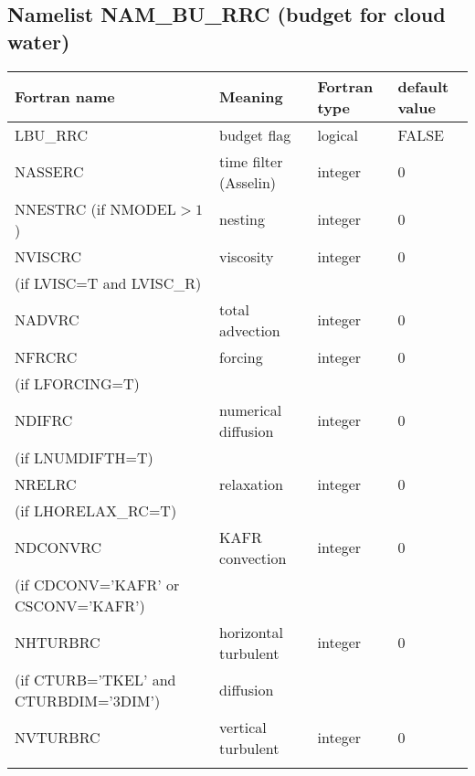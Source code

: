 \newpage
\subsection{Namelist NAM\_BU\_RRC (budget for cloud water)}

\begin{longtable} {|p{}|p{}|>{\centering}p{}|p{}<{\centering}|}
\hline
Fortran name & Meaning & Fortran type & default value \\
\hline \hline
\endhead
LBU\_RRC & budget flag & logical & FALSE\index{LBU\_RRC!\innam{NAM\_BU\_RRC}} \\\hline
NASSERC  & time filter (Asselin)   & integer  &  0 \index{NASSERC!\innam{NAM\_BU\_RRC}} \\\hline
NNESTRC (if NMODEL$>1$) & nesting           & integer  &  0 \index{NNESTRC!\innam{NAM\_BU\_RRC}} \\\hline
NVISCRC  & viscosity         & integer  &  0 \index{NVISCRC!\innam{NAM\_BU\_RRC}}\\
(if LVISC=T and LVISC\_R) &  &   &   \\\hline
NADVRC   & total advection   & integer  &  0 \index{NADVRC!\innam{NAM\_BU\_RRC}}\\\hline
NFRCRC   & forcing           & integer  &  0 \index{NFRCRC!\innam{NAM\_BU\_RRC}} \\ \nopagebreak
(if LFORCING=T) &  &   &   \\\hline
NDIFRC   & numerical diffusion & integer  &  0 \index{NDIFRC!\innam{NAM\_BU\_RRC}}\\ \nopagebreak
(if LNUMDIFTH=T) &  &   &   \\\hline
NRELRC   & relaxation        & integer  &  0 \index{NRELRC!\innam{NAM\_BU\_RRC}}\\ \nopagebreak
(if LHORELAX\_RC=T) &  &   &   \\\hline
NDCONVRC & KAFR convection   & integer  &  0 \index{NDCONVRC!\innam{NAM\_BU\_RRC}} \\ \nopagebreak
(if CDCONV='KAFR' or CSCONV='KAFR') &  &   &   \\\hline
NHTURBRC & horizontal turbulent  & integer  &  0 \index{NHTURBRC!\innam{NAM\_BU\_RRC}}\\ \nopagebreak
(if CTURB='TKEL' and CTURBDIM='3DIM') &diffusion &   &  \\\hline
NVTURBRC & vertical turbulent  & integer  &  0 \index{NVTURBRC!\innam{NAM\_BU\_RRC}}\\ \nopagebreak

\end{longtable}
